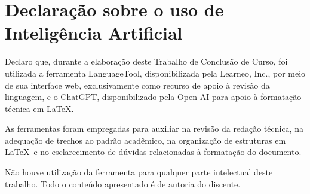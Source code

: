 \chapter*{Declaração sobre o uso de Inteligência Artificial}

Declaro que, durante a elaboração deste Trabalho de Conclusão de Curso, foi utilizada a ferramenta LanguageTool, disponibilizada pela Learneo, Inc., por meio de sua interface web, exclusivamente como recurso de apoio à revisão da linguagem, e o ChatGPT, disponibilizado pela Open AI para apoio à formatação técnica em \LaTeX.

As ferramentas foram empregadas para auxiliar na revisão da redação técnica, na adequação de trechos ao padrão acadêmico, na organização de estruturas em \LaTeX\ e no esclarecimento de dúvidas relacionadas à formatação do documento.

Não houve utilização da ferramenta para qualquer parte intelectual deste trabalho. Todo o conteúdo apresentado é de autoria do discente. %